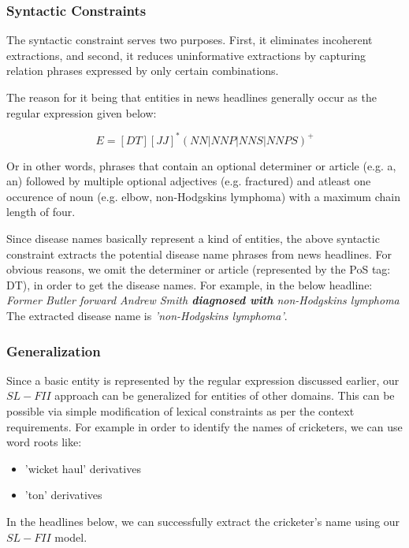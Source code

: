 \documentclass{article}
\begin{document}
\subsubsection{Syntactic Constraints}

The syntactic constraint serves two purposes. First, it eliminates incoherent extractions, and second, it
reduces uninformative extractions by capturing relation phrases
expressed by only certain combinations. 

The reason for it being that entities in news headlines generally occur as the regular expression given below:

\[E = [DT][JJ]^*(NN|NNP|NNS|NNPS)^+\]

Or in other words, phrases that contain an optional determiner or article (e.g. a, an)  followed by multiple optional adjectives (e.g. fractured) and atleast one occurence of noun (e.g. elbow, non-Hodgskins lymphoma) with a maximum chain length of four. 
 
Since disease names basically represent a kind of entities, the above syntactic constraint extracts the potential disease name phrases from news headlines. For obvious reasons, we omit the determiner or article (represented by the PoS tag: DT), in order to get the disease names. For example, in the below headline: \\

\textit{Former Butler forward Andrew Smith \textbf{diagnosed with} non-Hodgskins lymphoma 
}\\

The extracted disease name is \textit{'non-Hodgskins lymphoma'}.


\subsubsection{Generalization}
Since a basic entity is represented by the regular expression discussed earlier, our $SL-FII$ approach can be generalized for entities of other domains. This can be possible via simple modification of lexical constraints as per the context requirements. For example in order to identify the names of cricketers, we can use word roots like:

\begin{itemize}
\item 'wicket haul' derivatives
\item 'ton' derivatives
\end{itemize}

In the headlines below, we can successfully extract the cricketer's name using our $SL-FII$ model.\\
\end{document}
